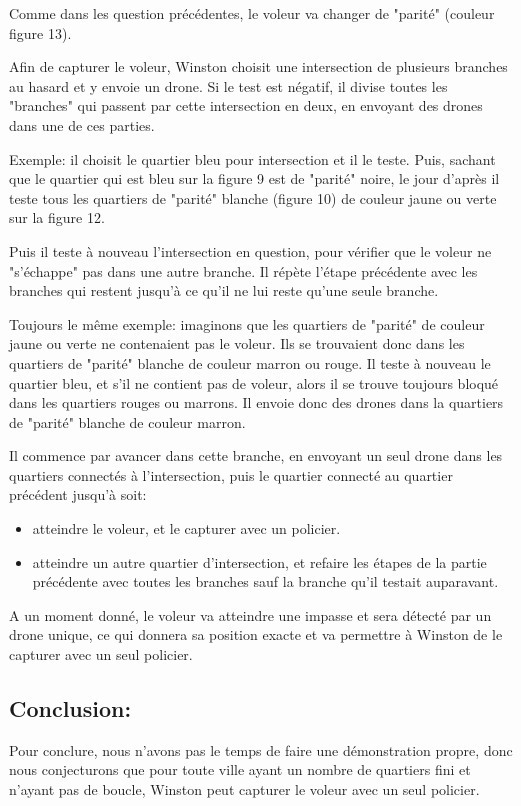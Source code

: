Comme dans les question précédentes, le voleur va changer de "parité" (couleur figure 13).

\medskip

Afin de capturer le voleur, Winston choisit une intersection de plusieurs branches au hasard et y envoie un drone. Si le test est négatif, il divise toutes les "branches" qui passent par cette intersection en deux, en envoyant des drones dans une de ces parties. 

\medskip

Exemple: il choisit le quartier bleu pour intersection et il le teste. Puis, sachant que le quartier qui est bleu sur la figure 9 est de "parité" noire, le jour d'après il teste tous les quartiers de "parité" blanche (figure 10) de couleur jaune ou verte sur la figure 12.

\medskip

Puis il teste à nouveau l'intersection en question, pour vérifier que le voleur ne "s'échappe" pas dans une autre branche. Il répète l'étape précédente avec les branches qui restent jusqu'à ce qu'il ne lui reste qu'une seule branche. 

\medskip

Toujours le même exemple: imaginons que les quartiers de "parité" de couleur jaune ou verte ne contenaient pas le voleur. Ils se trouvaient donc dans les quartiers de "parité" blanche de couleur marron ou rouge. Il teste à nouveau le quartier bleu, et s'il ne contient pas de voleur, alors il se trouve toujours bloqué dans les quartiers rouges ou marrons. Il envoie donc des drones dans la quartiers de "parité" blanche de couleur marron.

\medskip

Il commence par avancer dans cette branche, en envoyant un seul drone dans les quartiers connectés à l'intersection, puis le quartier connecté au quartier précédent jusqu'à soit:
\begin{itemize}
    \item atteindre le voleur, et le capturer avec un policier.
    \item atteindre un autre quartier d'intersection, et refaire les étapes de la partie précédente avec toutes les branches sauf la branche qu'il testait auparavant.
\end{itemize}
A un moment donné, le voleur va atteindre une impasse et sera détecté par un drone unique, ce qui donnera sa position exacte et va permettre à Winston de le capturer avec un seul policier.
\subsection{Conclusion:}
Pour conclure, nous n'avons pas le temps de faire une démonstration propre, donc nous conjecturons que pour toute ville ayant un nombre de quartiers fini et n'ayant pas de boucle, Winston peut capturer le voleur avec un seul policier.
